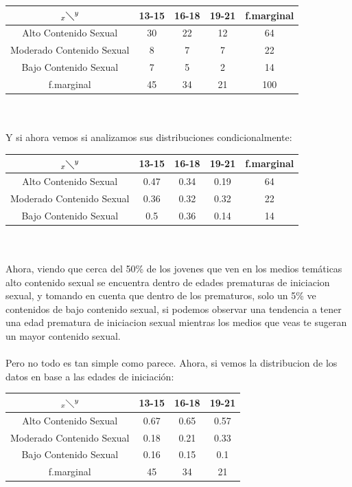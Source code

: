 \documentclass[letterpaper,spanish,11pt]{article}
\begin{document}
\begin{itemize}
\begin{enumerate}
\begin{enumerate}
        \begin{tabular}[c]{|c|c c c|c|}
        \hline
        $_x\diagdown ^{y}$ & 13-15 & 16-18 & 19-21 & f.marginal \\
        \hline
        Alto Contenido Sexual & 30 & 22 & 12 & 64 \\
        Moderado Contenido Sexual & 8 & 7 & 7 & 22 \\
        Bajo Contenido Sexual & 7 & 5 & 2 & 14 \\
	\hline
        f.marginal & 45 & 34 & 21 & 100 \\
        \hline
        \end{tabular}
\\\\

Y si ahora vemos si analizamos sus distribuciones condicionalmente:\\

        \begin{tabular}[c]{|c|c c c|c|}
        \hline
        $_x\diagdown ^{y}$ & 13-15 & 16-18 & 19-21 & f.marginal \\
        \hline
        Alto Contenido Sexual & 0.47 & 0.34 & 0.19 & 64 \\
        Moderado Contenido Sexual & 0.36 & 0.32 &0.32 & 22 \\
        Bajo Contenido Sexual & 0.5 & 0.36 & 0.14 & 14 \\
        \hline
        \end{tabular}
\\\\

Ahora, viendo que cerca del 50\% de los jovenes que ven en los medios tem\'aticas alto contenido sexual se encuentra dentro de edades prematuras de iniciacion sexual, y tomando en cuenta que dentro de los prematuros, solo un 5\% ve contenidos de bajo contenido sexual, si podemos observar una tendencia a tener una edad prematura de iniciacion sexual mientras los medios que veas te sugeran un mayor contenido sexual.\\\\

Pero no todo es tan simple como parece. Ahora, si vemos la distribucion de los datos en base a las edades de iniciaci\'on:\\

        \begin{tabular}[c]{|c|c c c|}
        \hline
        $_x\diagdown ^{y}$ & 13-15 & 16-18 & 19-21 \\
        \hline
        Alto Contenido Sexual & 0.67 & 0.65 & 0.57 \\
        Moderado Contenido Sexual & 0.18 & 0.21 & 0.33 \\
        Bajo Contenido Sexual & 0.16 & 0.15 & 0.1 \\
	\hline
        f.marginal & 45 & 34 & 21 \\
        \hline
        \end{tabular}
\\\\


\end{enumerate}
\end{enumerate}
\end{itemize}
\end{document}
